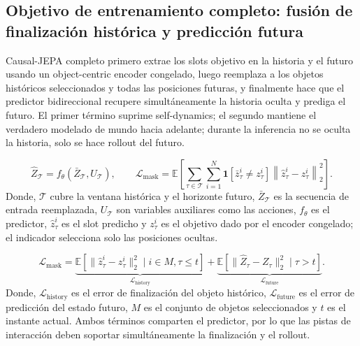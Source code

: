 \subsection{Objetivo de entrenamiento completo: fusión de finalización histórica y predicción futura}

Causal-JEPA completo primero extrae los slots objetivo en la historia y el futuro usando un object-centric encoder congelado, luego reemplaza a los objetos históricos seleccionados y todas las posiciones futuras, y finalmente hace que el predictor bidireccional recupere simultáneamente la historia oculta y prediga el futuro. El primer término suprime self-dynamics; el segundo mantiene el verdadero modelado de mundo hacia adelante; durante la inferencia no se oculta la historia, solo se hace rollout del futuro.


\[
\hat Z_{\mathcal T}=f_\theta(\bar Z_{\mathcal T},U_{\mathcal T}),
\qquad
\mathcal{L}_{\text{mask}}
=\mathbb{E}\!\left[
\sum_{\tau\in\mathcal T}\sum_{i=1}^{N}
\mathbf{1}[\bar z_\tau^i\neq z_\tau^i]
\left\|\hat z_\tau^i-z_\tau^i\right\|_2^2
\right].
\]
Donde, $\mathcal T$ cubre la ventana histórica y el horizonte futuro, $\bar Z_{\mathcal T}$ es la secuencia de entrada reemplazada, $U_{\mathcal T}$ son variables auxiliares como las acciones, $f_\theta$ es el predictor, $\hat z_\tau^i$ es el slot predicho y $z_\tau^i$ es el objetivo dado por el encoder congelado; el indicador selecciona solo las posiciones ocultas.

\[
\mathcal{L}_{\text{mask}}
=\underbrace{\mathbb{E}\!\left[\|\hat z_\tau^i-z_\tau^i\|_2^2\mid i\in M,\tau\le t\right]}_{\mathcal{L}_{\text{history}}}
+\underbrace{\mathbb{E}\!\left[\|\hat Z_\tau-Z_\tau\|_2^2\mid\tau>t\right]}_{\mathcal{L}_{\text{future}}}.
\]
Donde, $\mathcal{L}_{\text{history}}$ es el error de finalización del objeto histórico, $\mathcal{L}_{\text{future}}$ es el error de predicción del estado futuro, $M$ es el conjunto de objetos seleccionados y $t$ es el instante actual. Ambos términos comparten el predictor, por lo que las pistas de interacción deben soportar simultáneamente la finalización y el rollout.


